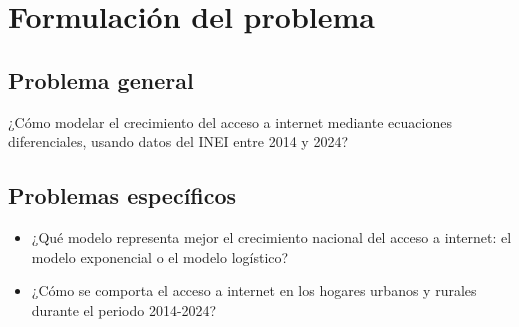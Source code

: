 \section{Formulación del problema}

\subsection{Problema general}

¿Cómo modelar el crecimiento del acceso a internet mediante ecuaciones diferenciales, usando datos del INEI entre 2014 y 2024?

\subsection{Problemas específicos}

\begin{itemize}
    \item ¿Qué modelo representa mejor el crecimiento nacional del acceso a internet: el modelo exponencial o el modelo logístico?
    \item ¿Cómo se comporta el acceso a internet en los hogares urbanos y rurales durante el periodo 2014-2024?
\end{itemize}
